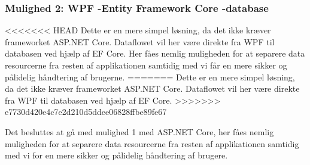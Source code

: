 \subsubsection{Mulighed 2: WPF -\g Entity Framework Core -\g database}
<<<<<<< HEAD
Dette er en mere simpel løsning, da det ikke kræver frameworket ASP.NET Core. Dataflowet vil her være direkte fra WPF til databasen ved hjælp af EF Core.
Her fåes nemlig muligheden for at separere data resourcerne fra resten af applikationen samtidig med vi får en mere sikker og pålidelig håndtering af brugerne.
=======
Dette er en mere simpel løsning, da det ikke kræver frameworket ASP.NET Core. Dataflowet vil her være direkte fra WPF til databasen ved hjælp af EF Core. 
>>>>>>> e7730d420e4c7e2d210d5ddee06828ffbe89fe67

Det besluttes at gå med mulighed 1 med ASP.NET Core, her fåes nemlig muligheden for at separere data resourcerne fra resten af applikationen samtidig med vi for en mere sikker og pålidelig håndtering af brugere.




